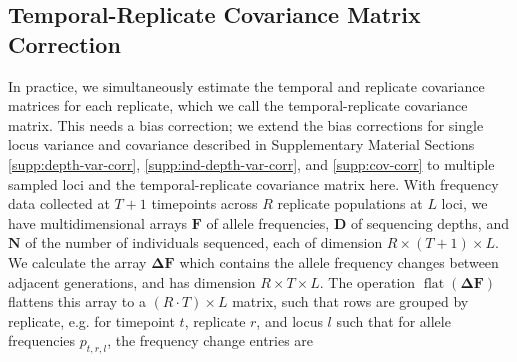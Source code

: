 \documentclass[11pt]{article}
\DeclareMathOperator{\flt}{\mathrm{flat}}
\begin{document}
\subsection{Temporal-Replicate Covariance Matrix Correction}
\label{supp:matrix-correction}

In practice, we simultaneously estimate the temporal and replicate covariance
matrices for each replicate, which we call the temporal-replicate covariance
matrix. This needs a bias correction; we extend the bias corrections for single
locus variance and covariance described in Supplementary Material Sections
\ref{supp:depth-var-corr}, \ref{supp:ind-depth-var-corr}, and
\ref{supp:cov-corr} to multiple sampled loci and the temporal-replicate
covariance matrix here. With frequency data collected at $T+1$ timepoints
across $R$ replicate populations at $L$ loci, we have multidimensional arrays
$\mathbf{F}$ of allele frequencies, $\mathbf{D}$ of sequencing depths, and
$\mathbf{N}$ of the number of individuals sequenced, each of dimension $R
\times (T+1) \times L$.  We calculate the array $\mathbf{\Delta F}$ which
contains the allele frequency changes between adjacent generations, and has
dimension $R \times T \times L$.  The operation
$\flt(\mathbf{\Delta}\mathbf{F})$ flattens this array to a $(R \cdot T) \times
L$ matrix, such that rows are grouped by replicate, e.g. for timepoint $t$,
replicate $r$, and locus $l$ such that for allele frequencies $p_{t, r, l}$,
the frequency change entries are 

\end{document}
